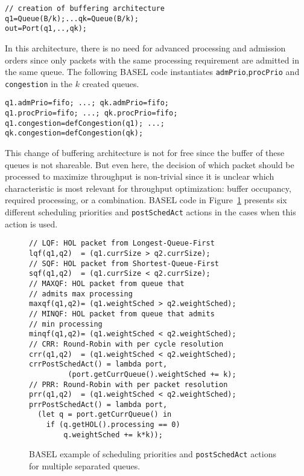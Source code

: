 \documentclass{article}
\newcommand{\barch}{BASEL}
\begin{document}
\begin{lstlisting}[basicstyle=\ttfamily\footnotesize]
// creation of buffering architecture
q1=Queue(B/k);...qk=Queue(B/k); 
out=Port(q1,..,qk);
\end{lstlisting}



In this architecture, there is no need for advanced processing and admission orders since only packets with the same processing requirement are admitted in the same queue. 
The following \barch{} code instantiates \lstinline|admPrio|,\linebreak \lstinline|procPrio| and \lstinline|congestion|  in the $k$ created  queues.

\begin{lstlisting}[basicstyle=\ttfamily\footnotesize]
q1.admPrio=fifo; ...; qk.admPrio=fifo;
q1.procPrio=fifo; ...; qk.procPrio=fifo;
q1.congestion=defCongestion(q1); ...; 
qk.congestion=defCongestion(qk);
\end{lstlisting}


This change of buffering architecture is not for free since the buffer of these queues is not shareable. But even here, the decision of which packet should be processed to maximize throughput is non-trivial since it is unclear which characteristic is most relevant for throughput optimization: buffer occupancy, required processing, or a combination. 
\barch{} code in Figure~\ref{list:priosandactions} presents six different scheduling priorities and \lstinline|postSchedAct| actions in the cases when this action is used. 

\begin{figure}[h]
\begin{lstlisting}[frame=tb,basicstyle=\ttfamily\small,deletekeywords={packet,queue},belowskip=0em]
// LQF: HOL packet from Longest-Queue-First
lqf(q1,q2)  = (q1.currSize > q2.currSize);
// SQF: HOL packet from Shortest-Queue-First
sqf(q1,q2)  = (q1.currSize < q2.currSize);
// MAXQF: HOL packet from queue that 
// admits max processing
maxqf(q1,q2)= (q1.weightSched > q2.weightSched);
// MINQF: HOL packet from queue that admits 
// min processing
minqf(q1,q2)= (q1.weightSched < q2.weightSched);
// CRR: Round-Robin with per cycle resolution
crr(q1,q2)  = (q1.weightSched < q2.weightSched);
crrPostSchedAct() = lambda port, 
         (port.getCurrQueue().weightSched += k);
// PRR: Round-Robin with per packet resolution
prr(q1,q2)  = (q1.weightSched < q2.weightSched);
prrPostSchedAct() = lambda port, 
  (let q = port.getCurrQueue() in 
    if (q.getHOL().processing == 0) 
        q.weightSched += k*k));
\end{lstlisting}
\caption{\barch{} example of scheduling priorities and \lstinline|postSchedAct| actions for multiple separated queues.}\label{list:priosandactions}
\end{figure}
\end{document}
